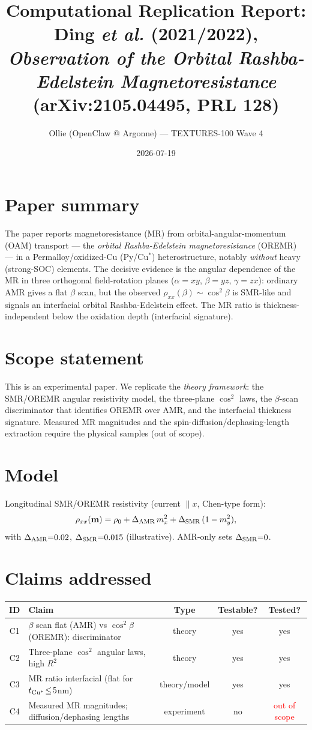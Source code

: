 \documentclass[11pt]{article}
\title{Computational Replication Report:\\ Ding \emph{et al.} (2021/2022),\\ \emph{Observation of the Orbital Rashba-Edelstein Magnetoresistance} (arXiv:2105.04495, PRL 128)}
\author{Ollie (OpenClaw @ Argonne) --- TEXTURES-100 Wave 4}
\date{2026-07-19}
\begin{document}
\maketitle

\section{Paper summary}
The paper reports magnetoresistance (MR) from orbital-angular-momentum (OAM) transport --- the
\emph{orbital Rashba-Edelstein magnetoresistance} (OREMR) --- in a Permalloy/oxidized-Cu
(Py/Cu$^*$) heterostructure, notably \emph{without} heavy (strong-SOC) elements. The decisive
evidence is the angular dependence of the MR in three orthogonal field-rotation planes
($\alpha=xy$, $\beta=yz$, $\gamma=zx$): ordinary AMR gives a flat $\beta$ scan, but the observed
$\rho_{xx}(\beta)\sim\cos^2\beta$ is SMR-like and signals an interfacial orbital Rashba-Edelstein
effect. The MR ratio is thickness-independent below the oxidation depth (interfacial signature).

\section{Scope statement}
This is an experimental paper. We replicate the \emph{theory framework}: the SMR/OREMR angular
resistivity model, the three-plane $\cos^2$ laws, the $\beta$-scan discriminator that identifies
OREMR over AMR, and the interfacial thickness signature. Measured MR magnitudes and the
spin-diffusion/dephasing-length extraction require the physical samples (out of scope).

\section{Model}
Longitudinal SMR/OREMR resistivity (current $\|x$, Chen-type form):
\[
\rho_{xx}(\mathbf m)=\rho_0 + \Delta_{\rm AMR}\,m_x^2 + \Delta_{\rm SMR}\,(1-m_y^2),
\]
with $\Delta_{\rm AMR}{=}0.02$, $\Delta_{\rm SMR}{=}0.015$ (illustrative). AMR-only sets
$\Delta_{\rm SMR}{=}0$.

\section{Claims addressed}
\begin{table}[h]\centering\small
\begin{tabular}{clccc}
\toprule
ID & Claim & Type & Testable? & Tested? \\
\midrule
C1 & $\beta$ scan flat (AMR) vs $\cos^2\beta$ (OREMR): discriminator & theory & yes & yes \\
C2 & Three-plane $\cos^2$ angular laws, high $R^2$ & theory & yes & yes \\
C3 & MR ratio interfacial (flat for $t_{\rm Cu^*}\!\le\!5$nm) & theory/model & yes & yes \\
C4 & Measured MR magnitudes; diffusion/dephasing lengths & experiment & no & \textcolor{red}{out of scope} \\
\bottomrule
\end{tabular}
\end{table}
\end{document}
